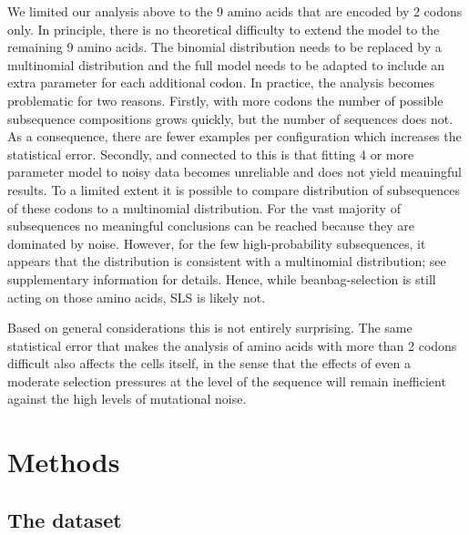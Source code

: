 \documentclass[a4paper,10pt]{paper}%
\begin{document}
\par
We  limited our analysis above to the 9 amino acids that are encoded by 2 codons only. In principle, there is no theoretical difficulty to extend the model to  the remaining 9 amino acids. The binomial distribution needs  to be replaced by a multinomial distribution and the full model needs to be adapted to  include an  extra parameter for each additional codon. In practice, the analysis  becomes problematic for two reasons. Firstly, with more codons the number of possible subsequence compositions grows quickly, but the number of sequences does not. As a consequence, there are fewer examples per configuration which increases the statistical error.  Secondly, and connected to this is that  fitting  4 or more parameter model to noisy data becomes unreliable and does not yield meaningful results. To a limited extent it is possible to compare distribution of subsequences of these codons to a multinomial distribution. For the vast majority of subsequences no meaningful conclusions can be reached because they are dominated by noise. However, for the few high-probability subsequences, it appears that the distribution is consistent with a multinomial distribution; see supplementary information for details. Hence, while  beanbag-selection is still acting on those amino acids, SLS is likely not.
\par
Based on general considerations this is not entirely surprising. The same statistical error that makes the analysis of amino acids with more than 2 codons difficult also affects the cells itself, in the sense that  the effects of even a moderate selection  pressures at the level of the sequence will remain inefficient against the high levels of mutational noise.



\section{Methods}



\subsection{The dataset}
\label{dataset}
\end{document}
